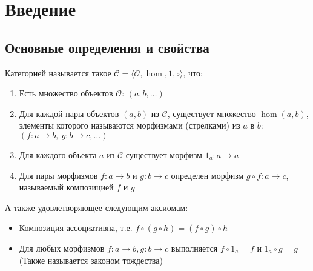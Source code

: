 \section{Введение}
\subsection{Основные определения и свойства}
\begin{defn}
  Категорией называется такое
  $\mathcal{C} = \langle \mathcal{O}, \hom, 1, \circ \rangle$, что:
  \begin{enumerate}
  \item Есть множество объектов $\mathcal{O}$: $(a, b, \ldots)$
  \item Для каждой пары объектов $(a, b)$ из $\mathcal{C}$, существует множество
    $\hom(a, b)$, элементы которого называются морфизмами (стрелками) из $a$ в $b$:
    $(f \colon a \to b,\ g \colon b \to c, \ldots)$
  \item Для каждого объекта $a$ из $\mathcal{C}$ существует морфизм
    $1_a \colon a \to a$
  \item Для пары морфизмов $f \colon a \to b$ и $g \colon b \to c$
    определен морфизм $g \circ f \colon a \to c$, называемый композицией $f$ и $g$
  \end{enumerate}
  А также удовлетворяющее следующим аксиомам:
  \begin{itemize}
  \item Композиция ассоциативна, т.е. $f \circ (g \circ h) = (f \circ g) \circ h$
  \item Для любых морфизмов $f \colon a \to b, g \colon b \to c$ выполняется
    $f \circ 1_a = f$ и $1_a \circ g = g$ (Также называется законом тождества)
  \end{itemize}
\end{defn}

